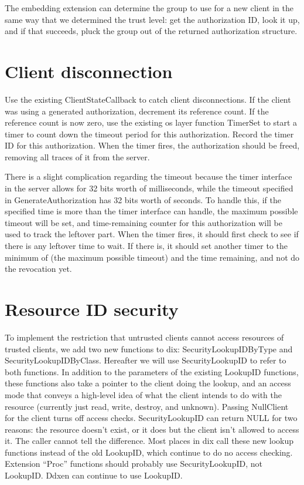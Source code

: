 \documentclass{article}
\begin{document}
The embedding extension can determine the group to use for a new
client in the same way that we determined the trust level: get the
authorization ID, look it up, and if that succeeds, pluck the group
out of the returned authorization structure.

\section{Client disconnection}

Use the existing ClientStateCallback to catch client disconnections.
If the client was using a generated authorization, decrement its
reference count.  If the reference count is now zero, use the existing
os layer function TimerSet to start a timer to count down the timeout
period for this authorization.  Record the timer ID for this
authorization.  When the timer fires, the authorization should be
freed, removing all traces of it from the server.

There is a slight complication regarding the timeout because the timer
interface in the server allows for 32 bits worth of milliseconds,
while the timeout specified in GenerateAuthorization has 32 bits worth
of seconds.  To handle this, if the specified time is more than the
timer interface can handle, the maximum possible timeout will be set,
and time-remaining counter for this authorization will be used to
track the leftover part.  When the timer fires, it should first check
to see if there is any leftover time to wait.  If there is, it should
set another timer to the minimum of (the maximum possible timeout) and
the time remaining, and not do the revocation yet.

\section{Resource ID security}

To implement the restriction that untrusted clients cannot access
resources of trusted clients, we add two new functions to dix:
SecurityLookupIDByType and SecurityLookupIDByClass.  Hereafter we will
use SecurityLookupID to refer to both functions.  In addition to the
parameters of the existing LookupID functions, these functions also
take a pointer to the client doing the lookup, and an access mode that
conveys a high-level idea of what the client intends to do with the
resource (currently just read, write, destroy, and unknown).  Passing
NullClient for the client turns off access checks.  SecurityLookupID
can return NULL for two reasons: the resource doesn't exist, or it
does but the client isn't allowed to access it.  The caller cannot
tell the difference.  Most places in dix call these new lookup
functions instead of the old LookupID, which continue to do no access
checking.  Extension ``Proc'' functions should probably use
SecurityLookupID, not LookupID.  Ddxen can continue to use LookupID.
\end{document}
